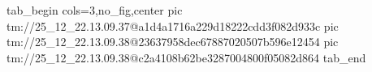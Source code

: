 
 
 
 
 

\qqSecCmtScr


\ifcmt
  tab_begin cols=3,no_fig,center
    pic tm://25_12_22.13.09.37@a1d4a1716a229d18222cdd3f082d933c
    pic tm://25_12_22.13.09.38@23637958dec67887020507b596e12454
    pic tm://25_12_22.13.09.38@c2a4108b62be3287004800f05082d864
  tab_end
\fi

